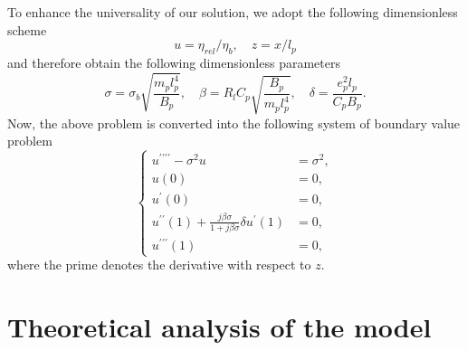 \documentclass{article}
\begin{document}
To enhance the universality of our solution, we adopt the following dimensionless scheme
\begin{equation}
    u = \eta_{rel} / \eta_b ,\quad z = x / l_p 
\end{equation}
and therefore obtain the following dimensionless parameters
\begin{equation}
    \sigma = \sigma_b \sqrt{\frac{m_p l_p^4}{B_p}}, \quad \beta = R_l C_p \sqrt{\frac{B_p}{m_p l_p^4}}, \quad \delta = \frac{e_p^2 l_p}{C_p B_p}.
\end{equation}
Now, the above problem is converted into the following system of boundary value problem
\begin{equation}
    \left\{\begin{aligned}
        u^{\prime\prime\prime\prime} -\sigma^2 u &= \sigma^2, \\
        u(0) &= 0, \\
        u^{\prime}(0) &= 0, \\
        u^{\prime\prime}(1)  + \frac{j \beta \sigma }{1 + j \beta \sigma } \delta u^{\prime}(1) &= 0, \\
        u^{\prime\prime\prime}(1) &= 0,
    \end{aligned}\right.
    \label{eq:eq_dimensionless_system_all}
\end{equation}
where the prime denotes the derivative with respect to $z$.


\section{Theoretical analysis of the model}
\end{document}
